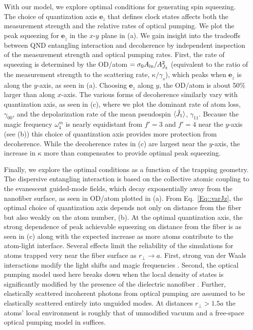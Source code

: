 \documentclass[preprint, aps,pra,onecolumn]{revtex4-1} %
\newcommand{\jx}{\hat{J}_1}
\newcommand{\qaxis}{\mathbf{e}_{\tilde{z}}}
\newcommand{\magic}[1]{\omega_{#1}^m}
\begin{document}
With our model, we explore optimal conditions for generating spin squeezing.  
The choice of quantization axis $\qaxis$ that defines clock states affects both the measurement strength and the relative rates of optical pumping. 
We plot the peak squeezing for $\qaxis$ in the $x$-$y$ plane in (a). 
We gain insight into the tradeoffs between QND entangling interaction and decoherence by independent inspection of the measurement strength and optical pumping rates.  
First, the rate of squeezing is determined by the OD/atom $=\sigma_0 A_{\rm in}/A_{J_3}^2$ (equivalent to the ratio of the measurement strength to the scattering rate, $\kappa/\gamma_s$), which peaks when $\qaxis$ is along the $y$-axis, as seen in (a). 
Choosing $\qaxis$ along $y$, the OD/atom is about 50\% larger than along $x$-axis.  
The various forms of decoherence similarly vary with quantization axis, as seen in (c), where we plot the dominant rate of atom loss, $\gamma_{00}$, and the depolarization rate of the mean pseudospin $\expt{\jx}$, $\gamma_{11}$. 
Because the magic frequency $\magic{4}$ is nearly equidistant from $f'=3$ and $f'=4$ near the $y$-axis (see (b)) this choice of quantization axis provides more protection from decoherence.   
While the decoherence rates in (c) are largest near the $y$-axis, the increase in $\kappa$ more than compensates to provide optimal peak squeezing.

Finally, we explore the optimal conditions as a function of the trapping geometry.  
The dispersive entangling interaction is based on the collective atomic coupling to the evanescent guided-mode fields, which decay exponentially away from the nanofiber surface, as seen in OD/atom plotted in (a). 
From Eq.~\eqref{Eq::varJz}, the optimal choice of quantization axis depends not only on distance from the fiber but also weakly on the atom number, (b).  
At the optimal quantization axis, the strong dependence of peak achievable squeezing on distance from the fiber is as seen in (c) along with the expected increase as more atoms contribute to the atom-light interface.  
Several effects limit the reliability of the simulations for atoms trapped very near the fiber surface as $r_\perp \rightarrow a$. 
First, strong van der Waals interactions modify the light shifts and magic frequencies \cite{vetsch_eugen_optical_2010, lacroute_state-insensitive_2012}.  
Second, the optical pumping model used here breaks down when the local density of states is significantly modified by the presence of the dielectric nanofiber \cite{le_kien_spontaneous_2005, le_kien_scattering_2006}. 
Further, elastically scattered incoherent photons from optical pumping are assumed to be elastically scattered entirely into unguided modes.  At distances $r_\perp > 1.5a$ the atoms' local environment is roughly that of unmodified vacuum \cite{le_kien_spontaneous_2005} and a free-space optical pumping model in  suffices. 
\end{document}
